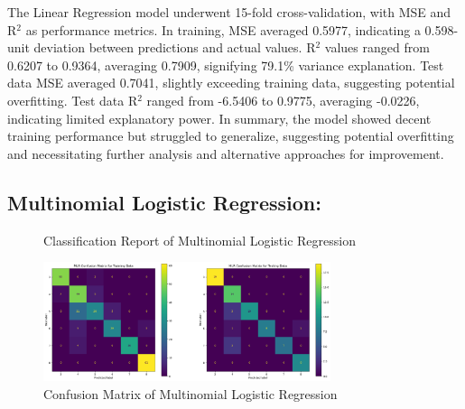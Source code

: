 \documentclass[11pt, letterpaper]{article}
\begin{document}
    \noindent The Linear Regression model underwent 15-fold cross-validation, with MSE and  R{$^2$} as performance metrics. In training, MSE averaged 0.5977, indicating a 0.598-unit deviation between predictions and actual values. R${^2}$ values ranged from 0.6207 to 0.9364, averaging 0.7909, signifying 79.1\% variance explanation. Test data MSE averaged 0.7041, slightly exceeding training data, suggesting potential overfitting. Test data R${^2}$ ranged from -6.5406 to 0.9775, averaging -0.0226, indicating limited explanatory power. 
    \noindent In summary, the model showed decent training performance but struggled to generalize, suggesting potential overfitting and necessitating further analysis and alternative approaches for improvement.
    
    \noindent\subsection*{Multinomial Logistic Regression:}
    
    \begin{figure}[H]
        \centering
        \qquad
        \caption{Classification Report of Multinomial Logistic Regression}
        \label{fig:class-report-mlr}
    \end{figure}

    \begin{figure}[H]
        \centering
        \includegraphics[width=0.75\textwidth]{mlr-confusion-matrix.png}
        \caption{Confusion Matrix of Multinomial Logistic Regression}
        \label{fig:confusion-matrix-mlr}
    \end{figure}
\end{document}
